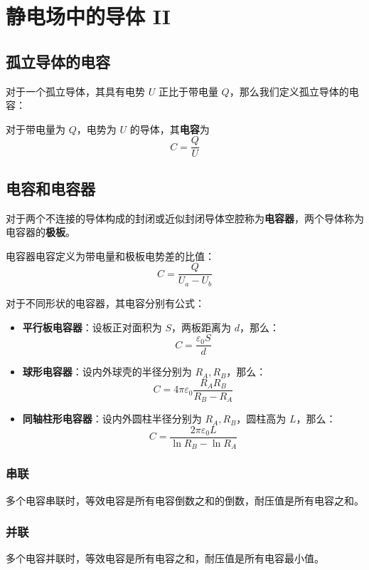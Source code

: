 \section{静电场中的导体 II}

\subsection{孤立导体的电容}

对于一个孤立导体，其具有电势 $U$ 正比于带电量 $Q$，那么我们定义孤立导体的电容：

\begin{definition}[孤立导体电容]
	对于带电量为 $Q$，电势为 $U$ 的导体，其\textbf{电容}为
	$$
	C = \frac{Q}{U}
	$$
\end{definition}

\subsection{电容和电容器}

对于两个不连接的导体构成的封闭或近似封闭导体空腔称为\textbf{电容器}，两个导体称为电容器的\textbf{极板}。

\begin{definition}[电容器的电容]
	电容器电容定义为带电量和极板电势差的比值：
	$$
	C = \frac{Q}{U_a - U_b}
	$$
\end{definition}

对于不同形状的电容器，其电容分别有公式：

\begin{itemize}
	\item \textbf{平行板电容器}：设板正对面积为 $S$，两板距离为 $d$，那么：
	$$
	C = \frac{\varepsilon_0 S}{d}
	$$
	\item \textbf{球形电容器}：设内外球壳的半径分别为 $R_A, R_B$，那么：
	$$
	C = 4 \pi \varepsilon_0 \frac{R_A R_B}{R_B - R_A}
	$$
	\item \textbf{同轴柱形电容器}：设内外圆柱半径分别为 $R_A, R_B$，圆柱高为 $L$，那么：
	$$
	C = \frac{2\pi \varepsilon_0 L}{\ln R_B - \ln R_A}
	$$
\end{itemize}

\subsubsection{串联}

多个电容串联时，等效电容是所有电容倒数之和的倒数，耐压值是所有电容之和。

\subsubsection{并联}

多个电容并联时，等效电容是所有电容之和，耐压值是所有电容最小值。
